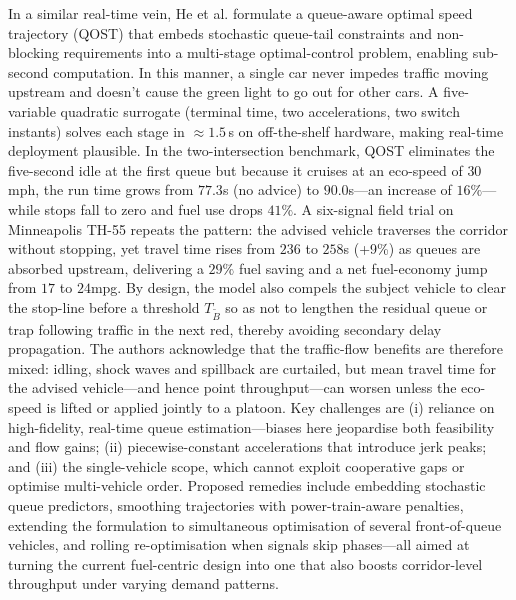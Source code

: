In a similar real-time vein, He et al. \cite{He2015} formulate a queue-aware optimal speed trajectory (QOST) that embeds stochastic queue-tail constraints and non-blocking requirements into a multi-stage optimal-control problem, enabling sub-second computation. In this manner, a single car never impedes traffic moving upstream and doesn't cause the green light to go out for other cars. A five-variable quadratic surrogate (terminal time, two accelerations, two switch instants) solves each stage in $\approx1.5\,$s on off-the-shelf hardware, making real-time deployment plausible. In the two-intersection benchmark, QOST eliminates the five-second idle at the first queue but because it cruises at an eco-speed of $30\,$mph, the run time grows from $77.3$s (no advice) to $90.0$s—an increase of $16\%$—while stops fall to zero and fuel use drops $41\%$. A six-signal field trial on Minneapolis TH-55 repeats the pattern: the advised vehicle traverses the corridor without stopping, yet travel time rises from $236$ to $258$s (+9\%) as queues are absorbed upstream, delivering a $29\%$ fuel saving and a net fuel-economy jump from $17$ to $24$mpg. By design, the model also compels the subject vehicle to clear the stop-line before a threshold $T_{\tilde B}$ so as not to lengthen the residual queue or trap following traffic in the next red, thereby avoiding secondary delay propagation. The authors acknowledge that the traffic-flow benefits are therefore mixed: idling, shock waves and spillback are curtailed, but mean travel time for the advised vehicle—and hence point throughput—can worsen unless the eco-speed is lifted or applied jointly to a platoon. Key challenges are (i) reliance on high-fidelity, real-time queue estimation—biases here jeopardise both feasibility and flow gains; (ii) piecewise-constant accelerations that introduce jerk peaks; and (iii) the single-vehicle scope, which cannot exploit cooperative gaps or optimise multi-vehicle order. Proposed remedies include embedding stochastic queue predictors, smoothing trajectories with power-train-aware penalties, extending the formulation to simultaneous optimisation of several front-of-queue vehicles, and rolling re-optimisation when signals skip phases—all aimed at turning the current fuel-centric design into one that also boosts corridor-level throughput under varying demand patterns.
\mynewline
